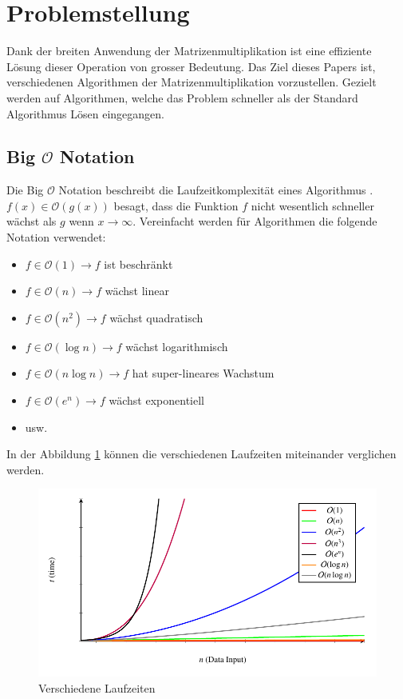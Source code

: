 %
%
%
\section{Problemstellung}
Dank der breiten Anwendung der Matrizenmultiplikation ist eine effiziente L\"osung dieser Operation von grosser Bedeutung.
Das Ziel dieses Papers ist, verschiedenen Algorithmen der Matrizenmultiplikation vorzustellen.
Gezielt werden auf Algorithmen, welche das Problem schneller als der Standard Algorithmus L\"osen eingegangen.

\subsection{Big $\mathcal{O}$ Notation}
Die Big $\mathcal{O}$ Notation beschreibt die Laufzeitkomplexit\"at eines Algorithmus \cite{multiplikation:bigo}.
$f(x) \in \mathcal{O}(g(x))$ besagt, dass die Funktion $f$ nicht wesentlich schneller w\"achst als $g$ wenn $x \rightarrow \infty$.
Vereinfacht werden f\"ur Algorithmen die folgende Notation verwendet:
\begin{itemize}
	\item $f \in \mathcal{O}(1) \rightarrow f$ ist beschr\"ankt
	\item $f \in \mathcal{O}(n) \rightarrow f$ w\"achst linear
	\item $f \in \mathcal{O}\left (n^2 \right ) \rightarrow f$ w\"achst quadratisch
	\item $f \in \mathcal{O}(\log n) \rightarrow f$ w\"achst logarithmisch
	\item $f \in \mathcal{O}(n \log n) \rightarrow f$ hat super-lineares Wachstum
	\item $f \in \mathcal{O}\left (e^n \right ) \rightarrow f$ w\"achst exponentiell
	\item usw.
\end{itemize}

In der Abbildung \ref{multiplikation:fig:bigo} k\"onnen die verschiedenen Laufzeiten miteinander verglichen werden. 

\begin{figure}
	\center
	\includegraphics[]{papers/multiplikation/images/bigo}
	\caption{Verschiedene Laufzeiten}
	\label{multiplikation:fig:bigo}
\end{figure}

